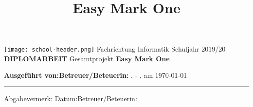 \documentclass[12pt,a4paper,oneside]{report}
\title{Easy Mark One}
\author{\IfPrivateBuild{\EmRealAuthorName}{T0astBread}}
\newcommand{\IfPrivateBuild}[2]{#1}
\newcommand{\IfPrivateBuild}[2]{#2}
\begin{document}
	\IfPrivateBuild{
		\texttt{[image: school-header.png]}
		\centering
		\vskip1cm
		Fachrichtung Informatik
		\vskip2cm
		Schuljahr 2019/20
		\vskip4cm
		\Huge\textbf{DIPLOMARBEIT}
		\vskip10pt
		\large
		Gesamtprojekt
		\vskip5pt
		\Huge\textbf{Easy Mark One}
		\small
		\vskip4cm
		\begin{flushleft}
			\textbf{Ausgeführt von:}\tabto{10cm}\textbf{Betreuer/Beteuerin:}\linebreak
			\EmRealAuthorName, \EmAuthorClass-\EmAuthorNumber
			\vskip2cm
			\EmPhysicalLocation, am \today
			\vskip1cm
			\hrule
			Abgabevermerk:\linebreak
			Datum:\tabto{10cm}Betreuer/Beteuerin:
		\end{flushleft}
	}{
		\maketitle
		\pagebreak
	}
\end{document}
